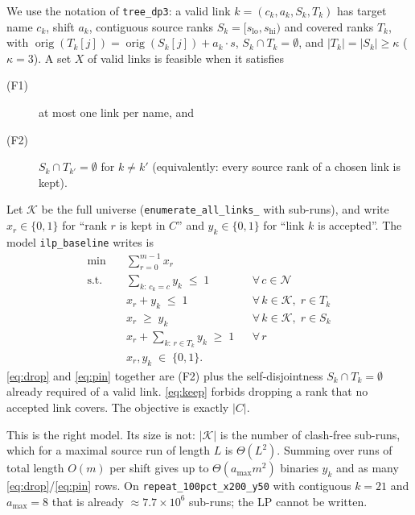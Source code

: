 \documentclass[11pt,a4paper]{article}
\theoremstyle{definition}
\theoremstyle{plain}
\theoremstyle{remark}
\newcommand{\orig}{\operatorname{orig}}
\newcommand{\Links}{\mathcal{K}}
\newcommand{\Names}{\mathcal{N}}
\begin{document}
We use the notation of \texttt{tree\_dp3}: a valid link
$k = (c_k, a_k, S_k, T_k)$ has target name $c_k$, shift $a_k$, contiguous
source ranks $S_k = [s_{\mathrm{lo}}, s_{\mathrm{hi}})$ and covered ranks
$T_k$, with $\orig(T_k[j]) = \orig(S_k[j]) + a_k\cdot s$,
$S_k \cap T_k = \emptyset$, and $|T_k| = |S_k| \ge \kappa$
($\kappa = 3$). A set $X$ of valid links is feasible when it satisfies
\begin{description}
\item[(F1)] at most one link per name, and
\item[(F2)] $S_k \cap T_{k'} = \emptyset$ for $k \ne k'$
  (equivalently: every source rank of a chosen link is kept).
\end{description}
Let $\Links$ be the full universe (\texttt{enumerate\_all\_links\_} with
sub-runs), and write $x_r \in \{0,1\}$ for ``rank $r$ is kept in $C$''
and $y_k \in \{0,1\}$ for ``link $k$ is accepted''. The model
\texttt{ilp\_baseline} writes is
\begin{align}
  \min\quad
    &\sum_{r=0}^{m-1} x_r
    \label{eq:obj} \\
  \text{s.t.}\quad
    &\sum_{k:\,c_k=c} y_k \;\le\; 1
      && \forall\, c \in \Names
      \tag{F1} \label{eq:F1} \\
    &x_r + y_k \;\le\; 1
      && \forall\, k \in \Links,\; r \in T_k
      \tag{drop} \label{eq:drop} \\
    &x_r \;\ge\; y_k
      && \forall\, k \in \Links,\; r \in S_k
      \tag{pin} \label{eq:pin} \\
    &x_r + \sum_{k:\,r \in T_k} y_k \;\ge\; 1
      && \forall\, r
      \tag{keep} \label{eq:keep} \\
    &x_r, y_k \;\in\; \{0,1\}.
      \nonumber
\end{align}
\eqref{eq:drop} and \eqref{eq:pin} together are (F2) plus the
self-disjointness $S_k \cap T_k = \emptyset$ already required of a valid
link. \eqref{eq:keep} forbids dropping a rank that no accepted link
covers. The objective is exactly $|C|$.

This is the right model. Its size is not: $|\Links|$ is the number of
clash-free sub-runs, which for a maximal source run of length $L$ is
$\Theta(L^2)$. Summing over runs of total length $O(m)$ per shift gives
up to $\Theta(a_{\max} m^2)$ binaries $y_k$ and as many
\eqref{eq:drop}/\eqref{eq:pin} rows. On
\texttt{repeat\_100pct\_x200\_y50} with contiguous $k{=}21$ and
$a_{\max}{=}8$ that is already $\approx 7.7{\times}10^6$ sub-runs; the
LP cannot be written.
\end{document}
